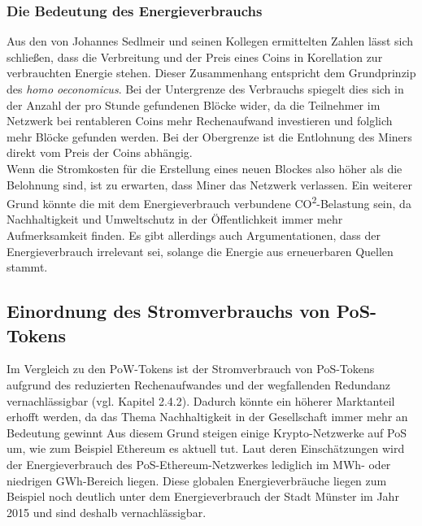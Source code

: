 \documentclass[12pt]{article}
\begin{document}
\subsubsection{Die Bedeutung des Energieverbrauchs}
Aus den von Johannes Sedlmeir und seinen Kollegen ermittelten Zahlen lässt sich schließen, dass die Verbreitung und der Preis eines Coins in Korellation zur verbrauchten Energie stehen. Dieser Zusammenhang entspricht dem Grundprinzip des \textit{homo oeconomicus}. Bei der Untergrenze des Verbrauchs spiegelt dies sich in der Anzahl der pro Stunde gefundenen Blöcke wider, da die Teilnehmer im Netzwerk bei rentableren Coins mehr Rechenaufwand investieren und folglich mehr Blöcke gefunden werden. Bei der Obergrenze ist die Entlohnung des Miners direkt vom Preis der Coins abhängig.\\
Wenn die Stromkosten für die Erstellung eines neuen Blockes also höher als die Belohnung sind, ist zu erwarten, dass Miner das Netzwerk verlassen. Ein weiterer Grund könnte die mit dem Energieverbrauch verbundene CO\textsuperscript{2}-Belastung sein, da Nachhaltigkeit und Umweltschutz in der Öffentlichkeit immer mehr Aufmerksamkeit finden. Es gibt allerdings auch Argumentationen, dass der Energieverbrauch irrelevant sei, solange die Energie aus erneuerbaren Quellen stammt.

\subsection{Einordnung des Stromverbrauchs von PoS-Tokens}
Im Vergleich zu den PoW-Tokens ist der Stromverbrauch von PoS-Tokens aufgrund des reduzierten Rechenaufwandes und der wegfallenden Redundanz vernachlässigbar (vgl. Kapitel 2.4.2). Dadurch könnte ein höherer Marktanteil erhofft werden, da das Thema Nachhaltigkeit in der Gesellschaft immer mehr an Bedeutung gewinnt Aus diesem Grund steigen einige Krypto-Netzwerke auf PoS um, wie zum Beispiel Ethereum es aktuell tut. Laut deren Einschätzungen wird der Energieverbrauch des PoS-Ethereum-Netzwerkes lediglich im MWh- oder niedrigen GWh-Bereich liegen. Diese globalen Energieverbräuche liegen zum Beispiel noch deutlich unter dem Energieverbrauch der Stadt Münster im Jahr 2015 und sind deshalb vernachlässigbar.
\end{document}
